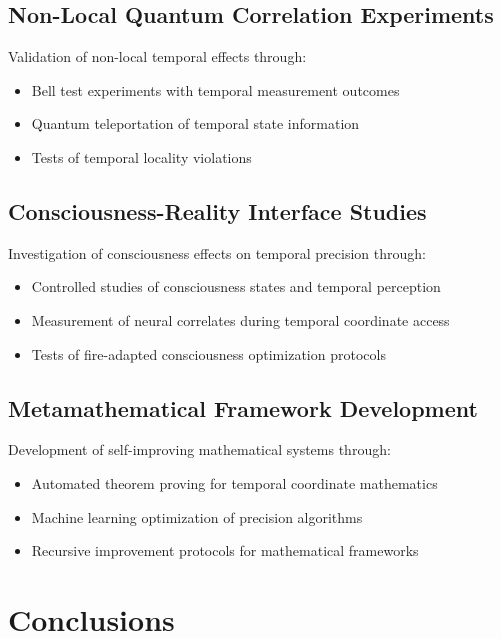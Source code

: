 \documentclass[11pt]{article}
\theoremstyle{remark}
\begin{document}
\subsection{Non-Local Quantum Correlation Experiments}

Validation of non-local temporal effects through:

\begin{itemize}
\item Bell test experiments with temporal measurement outcomes
\item Quantum teleportation of temporal state information
\item Tests of temporal locality violations
\end{itemize}

\subsection{Consciousness-Reality Interface Studies}

Investigation of consciousness effects on temporal precision through:

\begin{itemize}
\item Controlled studies of consciousness states and temporal perception
\item Measurement of neural correlates during temporal coordinate access
\item Tests of fire-adapted consciousness optimization protocols
\end{itemize}

\subsection{Metamathematical Framework Development}

Development of self-improving mathematical systems through:

\begin{itemize}
\item Automated theorem proving for temporal coordinate mathematics
\item Machine learning optimization of precision algorithms
\item Recursive improvement protocols for mathematical frameworks
\end{itemize}



\section{Conclusions}
\end{document}
